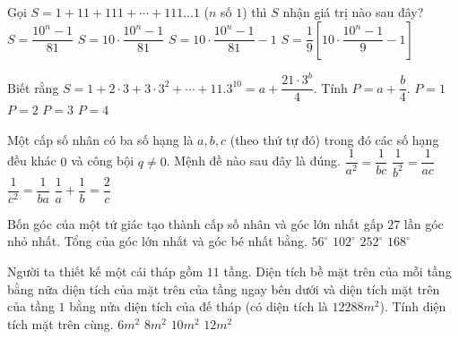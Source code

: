 \begin{ex}%
	Gọi $S=1+11+111+\cdots+111\ldots1$ ($n$ số $1$) thì $S$ nhận giá trị nào sau đây?
	\choice
	{$S=\dfrac{10^n-1}{81}$}
	{$S=10\cdot\dfrac{10^n-1}{81}$}
	{$S=10\cdot\dfrac{10^n-1}{81}-1$}
	{\True $S=\dfrac{1}{9}\left[10\cdot\dfrac{10^n-1}{9}-1\right]$}
\end{ex}
\begin{ex}%
	Biết rằng $S=1+2\cdot3+3\cdot3^2+\cdots+11.3^{10}=a+\dfrac{21\cdot3^b}{4}$. Tính $P=a+\dfrac{b}{4}$.
	\choice
	{$P=1$}
	{$P=2$}
	{\True $P=3$}
	{$P=4$}
\end{ex}
\begin{ex}%
	Một cấp số nhân có ba số hạng là $a,b,c$ (theo thứ tự đó) trong đó các số hạng đều khác $0$ và công bội $q\ne 0$. Mệnh đề nào sau đây là đúng.
	\choice
	{$\dfrac{1}{a^2}=\dfrac{1}{bc}$}
	{\True $\dfrac{1}{b^2}=\dfrac{1}{ac}$}
	{$\dfrac{1}{c^2}=\dfrac{1}{ba}$}
	{$\dfrac{1}{a}+\dfrac{1}{b}=\dfrac{2}{c}$}
\end{ex}
\begin{ex}%
	Bốn góc của một tứ giác tạo thành cấp số nhân và góc lớn nhất gấp $27$ lần góc nhỏ nhất. Tổng của góc lớn nhất và góc bé nhất bằng.
	\choice
	{$56^\circ$}
	{$102^\circ$}
	{\True $252^\circ$}
	{$168^\circ$}
\end{ex}
\begin{ex}%
	Người ta thiết kế một cái tháp gồm $11$ tầng. Diện tích bề mặt trên của mỗi tầng bằng nữa diện tích của mặt trên của tầng ngay bên dưới và diện tích mặt trên của tầng $1$ bằng nửa diện tích của đế tháp (có diện tích là $12288m^2$). Tính diện tích mặt trên cùng.
	\choice
	{\True $6m^2$}
	{$8m^2$}
	{$10m^2$}
	{$12m^2$}
\end{ex}
